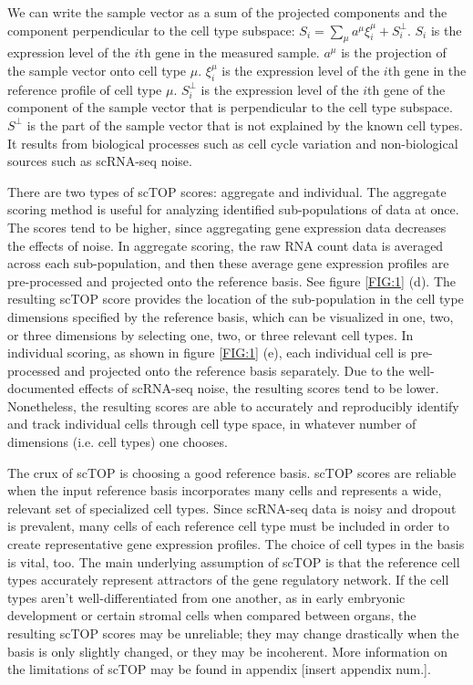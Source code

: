 \documentclass[aps,superscriptaddress, notitlepage,longbibliography]{revtex4-1}
\begin{document}
We can write the sample vector as a sum of the projected components and the component perpendicular to the cell type subspace: $S_i = \sum_\mu a^{\mu} \xi^{\mu}_i + S^{\perp}_i$. $S_i$ is the expression level of the $i$th gene in the measured sample. $a^{\mu}$ is the projection of the sample vector onto cell type $\mu$. $\xi^{\mu}_i$ is the expression level of the $i$th gene in the reference profile of cell type $\mu$. $S^{\perp}_i$ is the expression level of the $i$th gene of the component of the sample vector that is perpendicular to the cell type subspace. $S^{\perp}$ is the part of the sample vector that is not explained by the known cell types. It results from biological processes such as cell cycle variation and non-biological sources such as scRNA-seq noise. 

There are two types of scTOP scores: aggregate and individual. The aggregate scoring method is useful for analyzing identified sub-populations of data at once. The scores tend to be higher, since aggregating gene expression data decreases the effects of noise. In aggregate scoring, the raw RNA count data is averaged across each sub-population, and then these average gene expression profiles are pre-processed and projected onto the reference basis. See figure \ref{FIG:1} (d). The resulting scTOP score provides the location of the sub-population in the cell type dimensions specified by the reference basis, which can be visualized in one, two, or three dimensions by selecting one, two, or three relevant cell types. In individual scoring, as shown in figure \ref{FIG:1} (e), each individual cell is pre-processed and projected onto the reference basis separately. Due to the well-documented effects of scRNA-seq noise, the resulting scores tend to be lower. Nonetheless, the resulting scores are able to accurately and reproducibly identify and track individual cells through cell type space, in whatever number of dimensions (i.e. cell types) one chooses.

The crux of scTOP is choosing a good reference basis. scTOP scores are reliable when the input reference basis incorporates many cells and represents a wide, relevant set of specialized cell types. Since scRNA-seq data is noisy and dropout is prevalent, many cells of each reference cell type must be included in order to create representative gene expression profiles. The choice of cell types in the basis is vital, too. The main underlying assumption of scTOP is that the reference cell types accurately represent attractors of the gene regulatory network. If the cell types aren’t well-differentiated from one another, as in early embryonic development or certain stromal cells when compared between organs, the resulting scTOP scores may be unreliable; they may change drastically when the basis is only slightly changed, or they may be incoherent. More information on the limitations of scTOP may be found in appendix [insert appendix num.].
\end{document}
